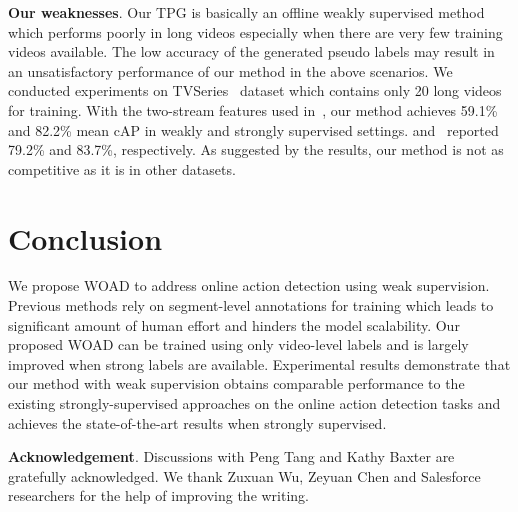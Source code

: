 \documentclass[final]{cvpr}
\begin{document}
\textbf{Our weaknesses}. Our TPG is basically an offline weakly supervised method which performs poorly in long videos especially when there are very few training videos available. The low accuracy of the generated pseudo labels may result in an unsatisfactory performance of our method in the above scenarios. We conducted experiments on TVSeries~\cite{de2016online} dataset which contains only 20 long videos for training. With the two-stream features used in~\cite{gao2017red,xu2019trn}, our method achieves 59.1\% and 82.2\% mean cAP in weakly and strongly supervised settings. \cite{gao2017red} and~\cite{xu2019trn} reported 79.2\% and 83.7\%, respectively. As suggested by the results, our method is not as competitive as it is in other datasets.

\section{Conclusion}
We propose WOAD to address online action detection using weak supervision. Previous methods rely on segment-level annotations for training which leads to significant amount of human effort and hinders the model scalability. Our proposed WOAD can be trained using only video-level labels and is largely improved when strong labels are available. Experimental results demonstrate that our method with weak supervision obtains comparable performance to the existing strongly-supervised approaches on the online action detection tasks and achieves the state-of-the-art results when strongly supervised.

\noindent\textbf{Acknowledgement}.
Discussions with Peng Tang and Kathy Baxter are gratefully acknowledged. We thank Zuxuan Wu,
Zeyuan Chen and Salesforce researchers for the help of improving the writing.

{\small


}
\end{document}
